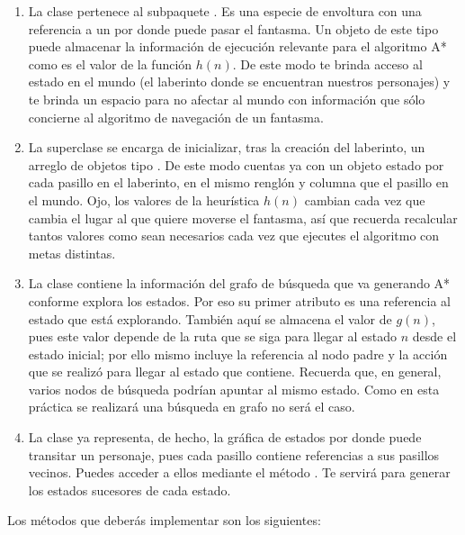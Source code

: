 \begin{enumerate}
 \item La clase  pertenece al subpaquete .  Es una especie de envoltura con una referencia a un  por donde puede pasar el fantasma.  Un objeto de este tipo puede almacenar la información de ejecución relevante para el algoritmo A* como es el valor de la función \(h(n)\).  De este modo te brinda acceso al estado en el mundo (el laberinto donde se encuentran nuestros personajes) y te brinda un espacio para no afectar al mundo con información que sólo concierne al algoritmo de navegación de un fantasma.
 
 \item La superclase  se encarga de inicializar, tras la creación del laberinto, un arreglo de objetos tipo .  De este modo cuentas ya con un objeto estado por cada pasillo en el laberinto, en el mismo renglón y columna que el pasillo en el mundo.  Ojo, los valores de la heurística $h(n)$ cambian cada vez que cambia el lugar al que quiere moverse el fantasma, así que recuerda recalcular tantos valores como sean necesarios cada vez que ejecutes el algoritmo con metas distintas.
 
 \item La clase  contiene la información del grafo de búsqueda que va generando A* conforme explora los estados.  Por eso su primer atributo es una referencia al estado que está explorando.  También aquí se almacena el valor de $g(n)$, pues este valor depende de la ruta que se siga para llegar al estado $n$ desde el estado inicial; por ello mismo incluye la referencia al nodo padre y la acción que se realizó para llegar al estado que contiene.  Recuerda que, en general, varios nodos de búsqueda podrían apuntar al mismo estado.  Como en esta práctica se realizará una búsqueda en grafo no será el caso.
 
 \item La clase  ya representa, de hecho, la gráfica de estados por donde puede transitar un personaje, pues cada pasillo contiene referencias a sus pasillos vecinos.  Puedes acceder a ellos mediante el método .  Te servirá para generar los estados sucesores de cada estado.
\end{enumerate}

Los métodos que deberás implementar son los siguientes:

